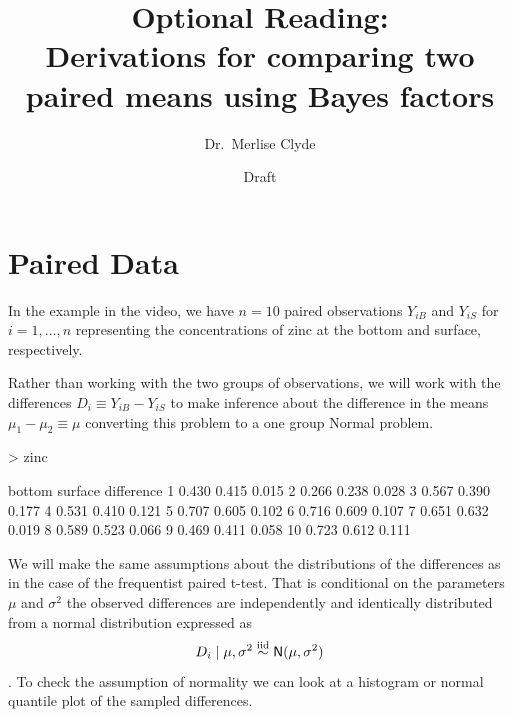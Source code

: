 \documentclass[11pt]{article}
\title{Optional Reading:\\ Derivations for comparing two paired means using Bayes factors}
\author{Dr.~Merlise Clyde}
\date{Draft}
\def\No{\textsf{N}}
\newcommand{\iid}{\ensuremath{\mathrel{\mathop{\sim}\limits^{\rm iid}}}}
\begin{document}



\maketitle








\section*{Paired Data}
In the example in the video,  we have $n = 10$ paired observations $Y_{iB}$ and $Y_{iS}$  for $i = 1, \ldots, n$ representing the concentrations of zinc at the bottom and surface, respectively.



Rather than working with the two groups of observations, we will work with the differences $D_{i} \equiv Y_{iB} - Y_{iS}$ to make inference about the difference in the means $\mu_1 - \mu_2 \equiv \mu$ converting this problem to a one group Normal problem.   

\begin{Schunk}
\begin{Sinput}
> zinc
\end{Sinput}
\begin{Soutput}
   bottom surface difference
1   0.430   0.415      0.015
2   0.266   0.238      0.028
3   0.567   0.390      0.177
4   0.531   0.410      0.121
5   0.707   0.605      0.102
6   0.716   0.609      0.107
7   0.651   0.632      0.019
8   0.589   0.523      0.066
9   0.469   0.411      0.058
10  0.723   0.612      0.111
\end{Soutput}
\end{Schunk}

We will make the same assumptions about the distributions of the differences as in the case of the frequentist paired t-test.  That is conditional on the parameters $\mu$ and $\sigma^2$
the observed differences are independently and identically distributed from a  normal distribution expressed  as
$$D_i \mid \mu, \sigma^2 \iid \No(\mu, \sigma^2)$$.  To check the assumption of normality we can look at a histogram or normal quantile plot of the sampled differences. 
\end{document}
